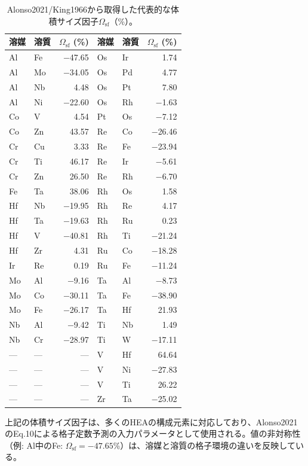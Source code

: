 \documentclass[a4paper,10pt,5p]{elsarticle}
\begin{document}
\begin{table}[htbp]
\centering
\caption{Alonso2021/King1966から取得した代表的な体積サイズ因子$\Omega_\mathrm{sf}$（\%）。}
\label{tab:appendix_omega}
\footnotesize
\begin{tabular}{llr|llr}
\hline
\textbf{溶媒} & \textbf{溶質} & $\Omega_\mathrm{sf}$ (\%) & \textbf{溶媒} & \textbf{溶質} & $\Omega_\mathrm{sf}$ (\%) \\
\hline
Al & Fe & $-$47.65 & Os & Ir & 1.74 \\
Al & Mo & $-$34.05 & Os & Pd & 4.77 \\
Al & Nb & 4.48 & Os & Pt & 7.80 \\
Al & Ni & $-$22.60 & Os & Rh & $-$1.63 \\
Co & V & 4.54 & Pt & Os & $-$7.12 \\
Co & Zn & 43.57 & Re & Co & $-$26.46 \\
Cr & Cu & 3.33 & Re & Fe & $-$23.94 \\
Cr & Ti & 46.17 & Re & Ir & $-$5.61 \\
Cr & Zn & 26.50 & Re & Rh & $-$6.70 \\
Fe & Ta & 38.06 & Rh & Os & 1.58 \\
Hf & Nb & $-$19.95 & Rh & Re & 4.17 \\
Hf & Ta & $-$19.63 & Rh & Ru & 0.23 \\
Hf & V & $-$40.81 & Rh & Ti & $-$21.24 \\
Hf & Zr & 4.31 & Ru & Co & $-$18.28 \\
Ir & Re & 0.19 & Ru & Fe & $-$11.24 \\
Mo & Al & $-$9.16 & Ta & Al & $-$8.73 \\
Mo & Co & $-$30.11 & Ta & Fe & $-$38.90 \\
Mo & Fe & $-$26.17 & Ta & Hf & 21.93 \\
Nb & Al & $-$9.42 & Ti & Nb & 1.49 \\
Nb & Cr & $-$28.97 & Ti & W & $-$17.11 \\
--- & --- & --- & V & Hf & 64.64 \\
--- & --- & --- & V & Ni & $-$27.83 \\
--- & --- & --- & V & Ti & 26.22 \\
--- & --- & --- & Zr & Ta & $-$25.02 \\
\hline
\end{tabular}
\end{table}

上記の体積サイズ因子は、多くのHEAの構成元素に対応しており、Alonso2021のEq.10による格子定数予測の入力パラメータとして使用される。値の非対称性（例: Al中のFe: $\Omega_\mathrm{sf} = -47.65$\%）は、溶媒と溶質の格子環境の違いを反映している。
\end{document}
